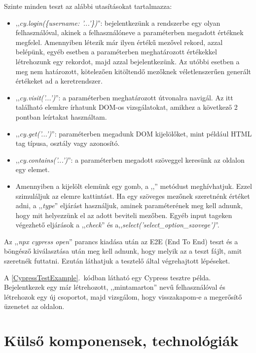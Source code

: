 \documentclass[
]{thesis-ekf}
\theoremstyle{definition}
\theoremstyle{remark}
\begin{document}
            Szinte minden teszt az alábbi utasításokat tartalmazza:
            \begin{itemize}
                \item ,,\emph{cy.login(\{username: '...'\})}'': bejelentkezünk a rendszerbe egy olyan felhasználóval, akinek a felhasználóneve a paraméterben megadott értéknek megfelel. Amennyiben létezik már ilyen értékű mezővel rekord, azzal belépünk, egyéb esetben a paraméterben meghatározott értékekkel létrehozunk egy rekordot, majd azzal bejelentkezünk. Az utóbbi esetben a meg nem határozott, kötelezően kitöltendő mezőknek véletlenszerűen generált értékeket ad a keretrendszer.
                \item ,,\emph{cy.visit('...')}'': a paraméterben meghatározott útvonalra navigál. Az itt található elemkre írhatunk DOM-os vizsgálatokat, amikhez a következő 2 pontban leírtakat használtam.
                \item ,,\emph{cy.get('...')}'': paraméterben megadunk DOM kijelölőket, mint például HTML tag típusa, osztály vagy azonosító.
                \item ,,\emph{cy.contains('...')}'': a paraméterben megadott szöveggel keresünk az oldalon egy elemet.
                \item Amennyiben a kijelölt elemünk egy gomb, a ,,'' metódust meghívhatjuk. Ezzel szimuláljuk az elemre kattintást. Ha egy szöveges mezőnek szeretnénk értéket adni, a ,,\emph{type}'' eljárást használjuk, aminek paraméterének meg kell adnunk, hogy mit helyezzünk el az adott beviteli mezőben. Egyéb input tageken végezhető eljárások a ,,\emph{check}'' és  a,,\emph{select('select\_option\_szovege')}''.
            \end{itemize}
            Az ,,\emph{npx cypress open}'' parancs kiadása után az E2E (End To End) teszt és a böngésző kiválasztása után meg kell adnunk, hogy melyik az a teszt fájlt, amit szeretnék futtatni. Ezután láthatjuk a tesztelő által végrehajtott lépéseket.

            A \ref{CypressTestExample}.~kódban látható egy Cypress tesztre példa. Bejelentkezek egy már létrehozott, ,,mintamarton'' nevű felhasználóval és létrehozok egy új csoportot, majd vizsgálom, hogy visszakapom-e a megerősítő üzenetet az oldalon.
            
        \chapter{Külső komponensek, technológiák}\label{Kulso}
\end{document}
